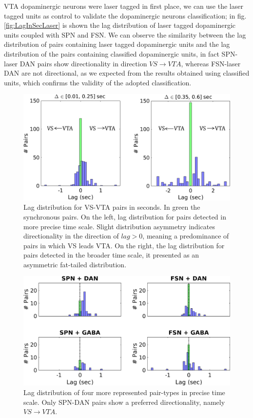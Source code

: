 VTA dopaminergic neurons were laser tagged in first place, we can use the laser tagged units as control to validate the dopaminergic neurons classification; in fig.\ref{fig:LagInSecLaser} is shown the lag distribution of laser tagged dopaminergic units coupled with SPN and FSN. We can observe the similarity between the lag distribution of pairs containing laser tagged dopaminergic units and the lag distribution of the pairs containing classified dopaminergic units, in fact SPN-laser DAN pairs show directionality in direction $VS\rightarrow VTA$, whereas FSN-laser DAN are not directional, as we expected from the results obtained using classified units, which confirms the validity of the adopted classification.\\
\begin{figure}[H]
\centering
\includegraphics[scale=0.6]{figures/LagGeneral1.pdf}
\caption{Lag distribution for VS-VTA pairs in seconds. In green the synchronous pairs. On the left, lag distribution for pairs detected in more precise time scale. Slight distribution asymmetry indicates directionality in the direction of $lag > 0$, meaning a predominance of pairs in which VS leads VTA. On the right, the lag distribution for pairs detected in the broader time scale, it presented as an asymmetric fat-tailed distribution.}
\label{fig:LagInSecAll}
\end{figure}
\begin{figure}[H]
\centering
\includegraphics[scale=0.5]{figures/LagSec4Typo3VS.png}
\caption{Lag distribution of four more represented pair-types in precise time scale. Only SPN-DAN pairs show a preferred directionality, namely $VS\rightarrow VTA$.}
\label{fig:LagInSec4typo}
\end{figure}
